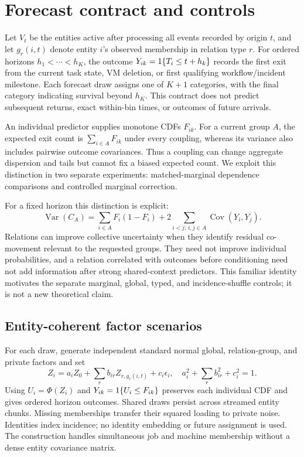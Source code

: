 \section{Forecast contract and controls}
Let $V_t$ be the entities active after processing all events recorded by origin
$t$, and let $g_r(i,t)$ denote entity $i$'s observed membership in relation type
$r$. For ordered horizons $h_1<\cdots<h_K$, the outcome
$Y_{ik}=1\{T_i\leq t+h_k\}$ records the first exit from the current task
state, VM deletion, or first qualifying workflow/incident milestone. Each forecast draw
assigns one of $K+1$ categories, with the final category indicating survival
beyond $h_K$. This contract does not predict subsequent returns, exact
within-bin times, or outcomes of future arrivals.

An individual predictor supplies monotone CDFs $F_{ik}$. For a current group
$A$, the expected exit count is $\sum_{i\in A}F_{ik}$ under every coupling,
whereas its variance also includes pairwise outcome covariances. Thus a
coupling can change aggregate dispersion and tails but cannot fix a biased
expected count. We exploit this distinction in two separate experiments:
matched-marginal dependence comparisons and controlled marginal correction.

For a fixed horizon this distinction is explicit:
\begin{equation}
 \operatorname{Var}(C_A)=\sum_{i\in A}F_i(1-F_i)
 +2\sum_{i<j;\,i,j\in A}\operatorname{Cov}(Y_i,Y_j).
\end{equation}
Relations can improve collective uncertainty when they identify residual
co-movement relevant to the requested groups. They need not improve individual
probabilities, and a relation correlated with outcomes before conditioning
need not add information after strong shared-context predictors. This familiar
identity motivates the separate marginal, global, typed, and incidence-shuffle
controls; it is not a new theoretical claim.

\subsection{Entity-coherent factor scenarios}
For each draw, generate independent standard normal global, relation-group,
and private factors and set
\begin{equation}
 Z_i=a_iZ_0+\sum_r b_{ir}Z_{r,g_r(i,t)}+c_i\epsilon_i,
 \quad a_i^2+\sum_r b_{ir}^2+c_i^2=1.
\end{equation}
Using $U_i=\Phi(Z_i)$ and $Y_{ik}=1\{U_i\leq F_{ik}\}$ preserves each
individual CDF and gives ordered horizon outcomes. Shared draws persist across
streamed entity chunks. Missing memberships transfer their squared loading
to private noise. Identities index incidence; no identity embedding or future
assignment is used. The construction handles simultaneous job and machine
membership without a dense entity covariance matrix.

